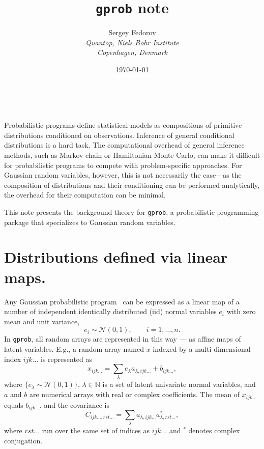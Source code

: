 \documentclass[a4paper,notitlepage]{article}
\makeatletter
\renewcommand{\maketitle}{\bgroup\setlength{\parindent}{0pt}
	\begin{center}
		\LARGE{\@title}
	\end{center}	
	\begin{flushright}
		\small{\@author}\\
		\small{\@date}
	\end{flushright}\egroup
}
\makeatother
\begin{document}
\title{\texttt{gprob} note}
\author{
Sergey Fedorov\\
\emph{Quantop, Niels Bohr Institute \\Copenhagen, Denmark}}
\date{\today}
\maketitle

Probabilistic programs define statistical models as compositions of primitive distributions conditioned on observations.
Inference of general conditional distributions is a hard task. 
The computational overhead of general inference methods, such as Markov chain or Hamiltonian Monte-Carlo, can make it difficult for probabilistic programs to compete with problem-specific approaches. 
For Gaussian random variables, however, this is not necessarily the case---as the composition of distributions and their conditioning can be performed analytically, the overhead for their computation can be minimal.


This note presents the background theory for \texttt{gprob}, a probabilistic programming package that specializes to Gaussian random variables. 


\section{Distributions defined via linear maps.}

Any Gaussian probabilistic program~\cite{stein_compositional_2021} can be expressed as a linear map of a number of independent identically distributed (iid) normal variables $e_i$ with zero mean and unit variance,
\begin{equation}
e_i \sim \mathcal{N}(0,1),\qquad i=1,\ldots,n.
\end{equation} 
In \texttt{gprob}, all random arrays are represented in this way --- as affine maps of latent variables. E.g., a random array named $x$ indexed by a multi-dimensional index $ijk\ldots$ is represented as
\begin{equation}
x_{ijk\ldots}=\sum_\lambda e_\lambda a_{\lambda, ijk\ldots}+b_{ijk\ldots},
\end{equation}
where $\{e_\lambda\sim \mathcal{N}(0,1)\}$, $\lambda \in \mathbb{N}$ is a set of latent univariate normal variables, and $a$ and $b$ are numerical arrays with real or complex coefficients. The mean of $x_{ijk\ldots}$ equals $b_{ijk\ldots}$, and the covariance is
\begin{equation}
C_{ijk\ldots,rst\ldots}=\sum_{\lambda} a_{\lambda, ijk\ldots} a^*_{\lambda, rst\ldots},
\end{equation}
where $rst\ldots$ run over the same set of indices as $ijk\ldots$ and $^*$ denotes complex conjugation.
\end{document}
